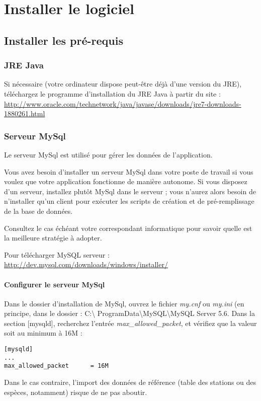 \chapter{Installer le logiciel}

\section{Installer les pré-requis}
\subsection{JRE Java}
Si nécessaire (votre ordinateur dispose peut-être déjà d'une version du JRE), téléchargez le programme d'installation du JRE Java à partir du site : \url{http://www.oracle.com/technetwork/java/javase/downloads/jre7-downloads-1880261.html}
\subsection{Serveur MySql}
Le serveur MySql est utilisé pour gérer les données de l'application.

Vous avez besoin d'installer un serveur MySql dans votre poste de travail si vous voulez que votre application fonctionne de manière autonome. Si vous disposez d'un serveur, installez plutôt MySql dans le serveur ; vous n'aurez alors besoin de n'installer qu'un client pour exécuter les scripts de création et de pré-remplissage de la base de données.

Consultez le cas échéant votre correspondant informatique pour savoir quelle est la meilleure stratégie à adopter.

Pour télécharger MySQL serveur : \url{http://dev.mysql.com/downloads/windows/installer/}

\subsubsection{Configurer le serveur MySql}
Dans le dossier d'installation de MySql, ouvrez le fichier \textit{my.cnf} ou \textit{my.ini} (en principe, dans le dossier : C:\textbackslash{} ProgramData\textbackslash{}MySQL\textbackslash{}MySQL Server 5.6. Dans la section [mysqld], recherchez l'entrée \textit{max\_allowed\_packet}, et vérifiez que la valeur soit au minimum à 16M :
\begin{lstlisting}
[mysqld]
...
max_allowed_packet      = 16M
\end{lstlisting}

Dans le cas contraire, l'import des données de référence (table des stations ou des espèces, notamment) risque de ne pas aboutir.

